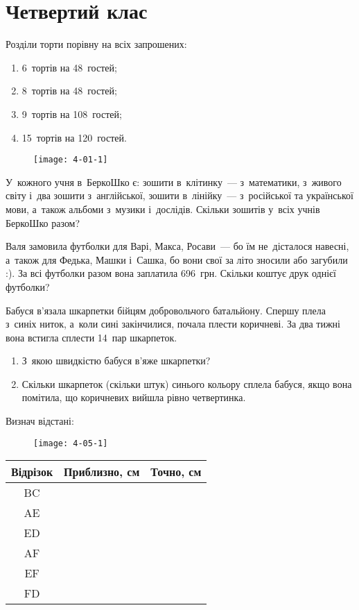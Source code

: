 \chapter{Четвертий клас}

\problem
Розділи торти порівну на всіх запрошених:
\begin{enumerate}
    \item 6~тортів на 48~гостей;
    \item 8~тортів на 48~гостей;
    \item 9~тортів на 108~гостей;
    \item 15~тортів на 120~гостей.
\end{enumerate}

\begin{figure}[h]
    \centering
    \texttt{[image: 4-01-1]}
\end{figure}


\problem
У~кожного учня в~БеркоШко є: зошити в~клітинку~--- з~математики,
з~живого світу і~два зошити з~англійської, зошити в~лінійку~---
з~російської та української мови, а~також альбоми з~музики і~дослідів.
Скільки зошитів у~всіх учнів БеркоШко разом?


\problem
Валя замовила футболки для Варі, Макса, Росави~--- бо їм не~дісталося навесні,
а~також для Федька, Машки і~Сашка, бо вони свої за літо зносили або загубили :).
За всі футболки разом вона заплатила 696~грн.
Скільки коштує друк однієї футболки? 


\problem
Бабуся в’язала шкарпетки бійцям добровольчого батальйону.
Спершу плела з~синіх ниток, а~коли сині закінчилися, почала плести коричневі.
За два тижні вона встигла сплести 14~пар шкарпеток.
\begin{enumerate}
    \item З~якою швидкістю бабуся в’яже шкарпетки? 
    \item Скільки шкарпеток (скільки штук) синього кольору сплела бабуся,
    якщо вона помітила, що коричневих вийшла рівно четвертинка.
\end{enumerate}


\problem
Визнач відстані:

\begin{figure}[h]
    \centering
    \texttt{[image: 4-05-1]}
\end{figure}

\begin{tabular}{|c|c|c|}
    \hline
    Відрізок & Приблизно, см & Точно, см \\ \hline
    BC & & \\ \hline
    AE & & \\ \hline
    ED & & \\ \hline
    AF & & \\ \hline
    EF & & \\ \hline
    FD & & \\ \hline
\end{tabular}


